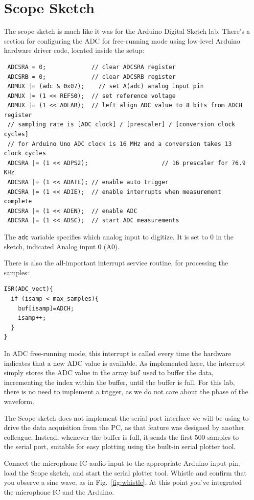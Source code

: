 \documentclass[12pt]{article}
\begin{document}
\section{Scope Sketch}

The scope sketch is much like it was for the Arduino Digital Sketch lab.  There's a section for configuring the ADC for free-running mode using low-level Arduino hardware driver code, located inside the setup: 
\begin{verbatim}
 ADCSRA = 0;             // clear ADCSRA register
 ADCSRB = 0;             // clear ADCSRB register
 ADMUX |= (adc & 0x07);    // set A(adc) analog input pin
 ADMUX |= (1 << REFS0);  // set reference voltage
 ADMUX |= (1 << ADLAR);  // left align ADC value to 8 bits from ADCH register
 // sampling rate is [ADC clock] / [prescaler] / [conversion clock cycles]
 // for Arduino Uno ADC clock is 16 MHz and a conversion takes 13 clock cycles
 ADCSRA |= (1 << ADPS2);                     // 16 prescaler for 76.9 KHz
 ADCSRA |= (1 << ADATE); // enable auto trigger
 ADCSRA |= (1 << ADIE);  // enable interrupts when measurement complete
 ADCSRA |= (1 << ADEN);  // enable ADC
 ADCSRA |= (1 << ADSC);  // start ADC measurements
\end{verbatim}
The {\tt adc} variable specifies which analog input to digitize.  It is set to 0 in the sketch, indicated Analog input 0 (A0).

There is also the all-important interrupt service routine, for processing the samples:
\begin{verbatim}
ISR(ADC_vect){
  if (isamp < max_samples){
    buf[isamp]=ADCH;
    isamp++;      
  }
}    
\end{verbatim}
In ADC free-running mode, this interrupt is called every time the hardware indicates that a new ADC value is available.  As implemented here, the interrupt simply stores the ADC value in the array {\tt buf} used to buffer the data, incrementing the index within the buffer, until the buffer is full.  For this lab, there is no need to implement a trigger, as we do not care about the phase of the waveform.

The Scope sketch does not implement the serial port interface we will be using to drive the data acquisition from the PC, as that feature was designed by another colleague.  Instead, whenever the buffer is full, it sends the first 500 samples to the serial port, suitable for easy plotting using the built-in serial plotter tool.  

Connect the microphone IC audio input to the appropriate Arduino input pin, load the Scope sketch, and start the serial plotter tool.   Whistle and confirm that you observe a sine wave, as in Fig.~\ref{fig:whistle}.
At this point you've integrated the microphone IC and the Arduino.
\end{document}

